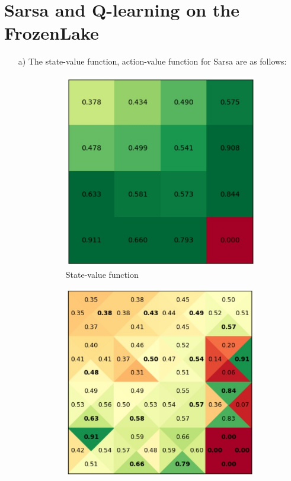 \documentclass{article}
\begin{document}
\section{Sarsa and Q-learning on the FrozenLake}
\begin{enumerate}
	\item[a)] The state-value function, action-value function for Sarsa are as follows:
	\begin{figure}[H]
	\begin{subfigure}[b]{0.5\linewidth}
		\includegraphics[width = \linewidth]{SarsaV1.jpg}
		\caption{State-value function}
	\end{subfigure}
	\begin{subfigure}[b]{0.5\linewidth}
		\includegraphics[width = \linewidth]{SarsaQ1.jpg}

\end{subfigure}
\end{figure}
\end{enumerate}
\end{document}
